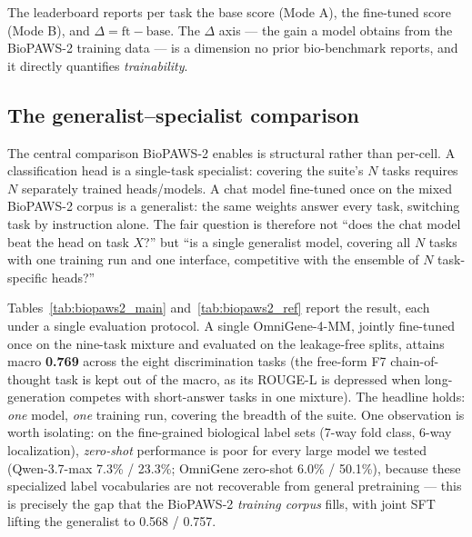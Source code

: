 The leaderboard reports per task the base score (Mode A), the fine-tuned score (Mode B),
and $\Delta = \text{ft} - \text{base}$. The $\Delta$ axis --- the gain a model obtains from
the BioPAWS-2 training data --- is a dimension no prior bio-benchmark reports, and it
directly quantifies \emph{trainability}.

\subsection{The generalist--specialist comparison}
\label{sec:biopaws2_generalist}

The central comparison BioPAWS-2 enables is structural rather than per-cell. A
classification head is a single-task specialist: covering the suite's $N$ tasks requires
$N$ separately trained heads/models. A chat model fine-tuned once on the mixed BioPAWS-2
corpus is a generalist: the same weights answer every task, switching task by instruction
alone. The fair question is therefore not ``does the chat model beat the head on task
$X$?'' but ``is a single generalist model, covering all $N$ tasks with one training run and
one interface, competitive with the ensemble of $N$ task-specific heads?''

Tables~\ref{tab:biopaws2_main} and~\ref{tab:biopaws2_ref} report the result, each under a
single evaluation protocol. A single OmniGene-4-MM, jointly fine-tuned once on the nine-task
mixture and evaluated on the leakage-free splits, attains macro \textbf{0.769} across the
eight discrimination tasks (the free-form F7 chain-of-thought task is kept out of the macro,
as its ROUGE-L is depressed when long-generation competes with short-answer tasks in one
mixture). The headline holds: \emph{one} model, \emph{one} training run, covering the breadth
of the suite. One observation is worth isolating: on the fine-grained biological label sets
(7-way fold class, 6-way localization), \emph{zero-shot} performance is poor for every large
model we tested (Qwen-3.7-max 7.3\% / 23.3\%; OmniGene zero-shot 6.0\% / 50.1\%), because
these specialized label vocabularies are not recoverable from general pretraining --- this is
precisely the gap that the BioPAWS-2 \emph{training corpus} fills, with joint SFT lifting the
generalist to 0.568 / 0.757.

